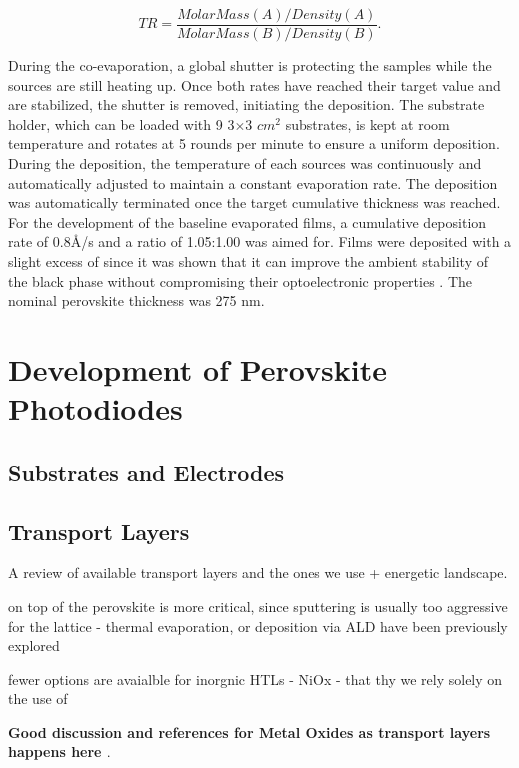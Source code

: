 \begin{equation}
    TR = \frac{MolarMass(A)/Density(A)}{MolarMass(B)/Density(B)}.
\end{equation}

During the co-evaporation, a global shutter is protecting the samples while the sources are still heating up. Once both rates have reached their target value and are stabilized, the shutter is removed, initiating the deposition. The substrate holder, which can be loaded with 9 3$\times$3 $cm^2$ substrates, is kept at room temperature and rotates at 5 rounds per minute to ensure a uniform deposition. During the deposition, the temperature of each sources was continuously and automatically adjusted to maintain a constant evaporation rate. The deposition was automatically terminated once the target cumulative thickness was reached. For the development of the baseline evaporated films, a cumulative deposition rate of 0.8{\AA}/s and a  ratio of 1.05:1.00 was aimed for. Films were deposited with a slight excess of  since it was shown that it can improve the ambient stability of the black phase without compromising their optoelectronic properties \cite{Ma2017TheCells}. The nominal perovskite thickness was 275 nm. 




\section{Development of Perovskite Photodiodes}

\subsection{Substrates and Electrodes}

\subsection{Transport Layers}

A review of available transport layers and the ones we use + energetic landscape.

on top of the perovskite is more critical, since sputtering is usually too aggressive for the lattice - thermal evaporation, or deposition via ALD have been previously explored 

fewer options are avaialble for inorgnic HTLs - NiOx - that thy we rely solely on the use of 


\textbf{Good discussion and references for Metal Oxides as transport layers happens here \cite{Yang2023InvertedPassivation}}.






